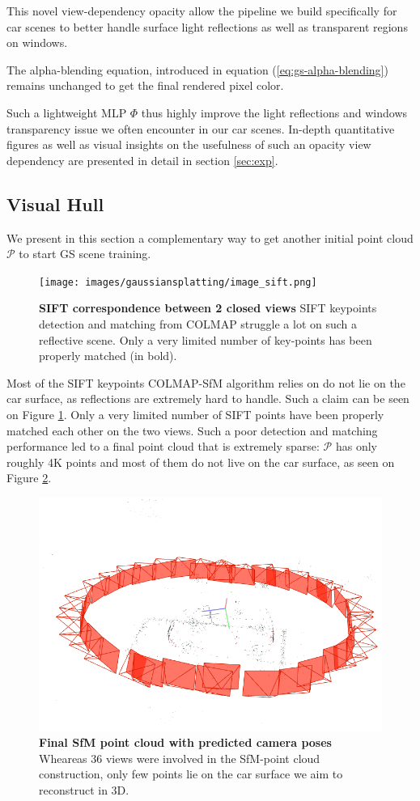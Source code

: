 This novel view-dependency opacity allow the pipeline we build specifically for car scenes to better handle surface light reflections as well as transparent regions on windows.

The alpha-blending equation, introduced in equation (\ref{eq:gs-alpha-blending}) remains unchanged to get the final rendered pixel color.

Such a lightweight MLP $\Phi$ thus highly improve the light reflections and windows transparency issue we often encounter in our car scenes. In-depth quantitative figures as well as visual insights on the usefulness of such an opacity view dependency are presented in detail in section \ref{sec:exp}. 

\subsection{Visual Hull}

We present in this section a complementary way to get another initial point cloud $\mathcal{P}$ to start GS scene training. 


\begin{figure}[htbp!]
    \center
  \texttt{[image: images/gaussiansplatting/image\_sift.png]}
  \caption{\textbf{SIFT correspondence between 2 closed views} SIFT keypoints detection and matching from COLMAP struggle a lot on such a reflective scene. Only a very limited number of key-points has been properly matched (in bold).}
  \label{fig:sift-colmap}
\end{figure}

Most of the SIFT keypoints COLMAP-SfM algorithm relies on do not lie on the car surface, as reflections are extremely hard to handle. Such a claim can be seen on Figure \ref{fig:sift-colmap}. Only a very limited number of SIFT points have been properly matched each other on the two views. Such a poor detection and matching performance led to a 
final point cloud that is extremely sparse: $\mathcal{P}$ has only roughly 4K points and most of them do not live on the car surface, as seen on Figure \ref{fig:sfm-colmap-pc}. 

\begin{figure}[htbp!]
    \center
  \includegraphics[width=.8\linewidth]{images/gaussiansplatting/colmap_sparsePC.png}
  \caption{\textbf{Final SfM point cloud with predicted camera poses} Wheareas 36 views were involved in the SfM-point cloud construction, only few points lie on the car surface we aim to reconstruct in 3D.}
  \label{fig:sfm-colmap-pc}
\end{figure}


